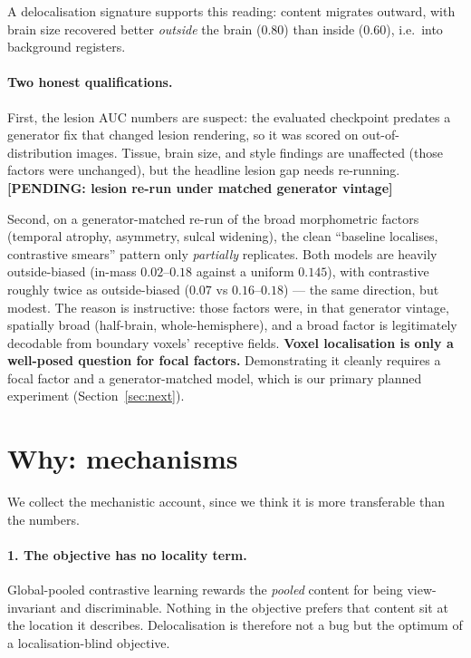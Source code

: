 \documentclass[11pt]{article}
\newcommand{\pending}[1]{{\color{red}\textbf{[PENDING: #1]}}}
\newcommand{\suspect}[1]{{\color{orange}#1}}
\begin{document}
A delocalisation signature supports this reading: content migrates outward, with
brain size recovered better \emph{outside} the brain ($0.80$) than inside
($0.60$), i.e.\ into background registers.

\paragraph{Two honest qualifications.} First, \suspect{the lesion AUC numbers are
suspect}: the evaluated checkpoint predates a generator fix that changed lesion
rendering, so it was scored on out-of-distribution images. Tissue, brain size,
and style findings are unaffected (those factors were unchanged), but the
headline lesion gap needs re-running.
\pending{lesion re-run under matched generator vintage}

Second, on a generator-matched re-run of the broad morphometric factors
(temporal atrophy, asymmetry, sulcal widening), the clean ``baseline localises,
contrastive smears'' pattern only \emph{partially} replicates. Both models are
heavily outside-biased (in-mass $0.02$--$0.18$ against a uniform $0.145$), with
contrastive roughly twice as outside-biased ($0.07$ vs $0.16$--$0.18$) --- the
same direction, but modest. The reason is instructive: those factors were, in
that generator vintage, spatially broad (half-brain, whole-hemisphere), and a
broad factor is legitimately decodable from boundary voxels' receptive fields.
\textbf{Voxel localisation is only a well-posed question for focal factors.}
Demonstrating it cleanly requires a focal factor and a generator-matched model,
which is our primary planned experiment (Section~\ref{sec:next}).

\section{Why: mechanisms}
\label{sec:why}

We collect the mechanistic account, since we think it is more transferable than
the numbers.

\paragraph{1. The objective has no locality term.} Global-pooled contrastive
learning rewards the \emph{pooled} content for being view-invariant and
discriminable. Nothing in the objective prefers that content sit at the location
it describes. Delocalisation is therefore not a bug but the optimum of a
localisation-blind objective.
\end{document}
